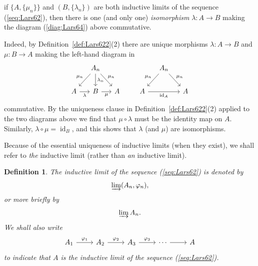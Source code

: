 \documentclass{book}
\newtheorem{definition}{Definition}[section]
\begin{document}
if \(\{A,\{\mu_n\}\}\) and \((B,\{\lambda_n\})\) are both inductive limits of the sequence (\ref{seq:Lars62}),
then there is one (and only one) \textit{isomorphism} \(\lambda:A\to B\) making the diagram (\ref{diag:Lars64})
above commutative.\par
Indeed, by Definition~\ref{def:Lars622}(2) there are unique morphisms \(\lambda:A\to B\) and \(\mu:B\to A\)
making the left-hand diagram in
\[
  \begin{tikzcd}[column sep=small]
    & A_n
      \arrow[dl, "\mu_{n}",swap]
      \arrow[dr, "\mu_n"]\arrow[d,"\lambda_n"] &\\
    A\arrow[r, "\lambda",swap]&B\arrow[r,"\mu",swap]&A
  \end{tikzcd}\qquad
  \begin{tikzcd}[column sep=small]
    & A_n
      \arrow[dl, "\mu_{n}",swap]
      \arrow[dr, "\mu_n"] &\\
    A\arrow[rr, "\operatorname{id}_A",swap]
    &&
    A
  \end{tikzcd}
\] 
commutative. By the uniqueness clause in Definition~\ref{def:Lars622}(2) applied to the two 
diagrams above we find that \(\mu\circ\lambda\) must be the identity map on \(A\).
Similarly, \(\lambda\circ\mu=\operatorname{id}_B\), and this shows that \(\lambda\) (and \(\mu\))
are isomorphisms.\par
Because of the essential uniqueness of inductive limits (when they exist),
we shall refer to \textit{the} inductive limit (rather than \textit{an} inductive limit).
\begin{definition}
  The inductive limit of the sequence (\ref{seq:Lars62}) is denoted by
  \[
    \varinjlim(A_n,\varphi_n),
  \]
  or more briefly by
  \[
    \varinjlim A_n.
  \]
  We shall also write
  \[
    \begin{tikzcd}
      A_1\arrow[r,"\varphi_1"]&A_2\arrow[r,"\varphi_2"]&A_3\arrow[r,"\varphi_3"]&\cdots\arrow[r]&A
    \end{tikzcd}
  \]
  to indicate that \(A\) is the inductive limit of the sequence (\ref{seq:Lars62}).
\end{definition}
\end{document}
